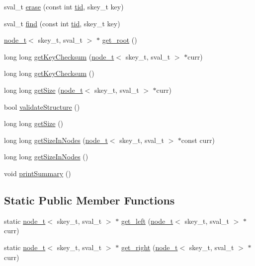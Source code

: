 \begin{DoxyCompactItemize}
\item 
sval\+\_\+t \hyperlink{classnatarajan__ext__bst__lf_a4e26b944d7a22b38c367a5a9272a65df}{erase} (const int \hyperlink{microbench_2main_8cpp_a9ca9869868fe7e7a38a921cc7de4103f}{tid}, skey\+\_\+t key)
\item 
sval\+\_\+t \hyperlink{classnatarajan__ext__bst__lf_aaca04e90b6cd390c3cf5701a08bcdb51}{find} (const int \hyperlink{microbench_2main_8cpp_a9ca9869868fe7e7a38a921cc7de4103f}{tid}, skey\+\_\+t key)
\item 
\hyperlink{structnode__t}{node\+\_\+t}$<$ skey\+\_\+t, sval\+\_\+t $>$ $\ast$ \hyperlink{classnatarajan__ext__bst__lf_aa6b371791b726b19343e1a6c64d38f92}{get\+\_\+root} ()
\item 
long long \hyperlink{classnatarajan__ext__bst__lf_a33ed925f7c23b46bf67a688d78e1714a}{get\+Key\+Checksum} (\hyperlink{structnode__t}{node\+\_\+t}$<$ skey\+\_\+t, sval\+\_\+t $>$ $\ast$curr)
\item 
long long \hyperlink{classnatarajan__ext__bst__lf_a6120769d8b8d6a14e673649d6ece6454}{get\+Key\+Checksum} ()
\item 
long long \hyperlink{classnatarajan__ext__bst__lf_a71a59c42d573aa3150a7a46d9ca94041}{get\+Size} (\hyperlink{structnode__t}{node\+\_\+t}$<$ skey\+\_\+t, sval\+\_\+t $>$ $\ast$curr)
\item 
bool \hyperlink{classnatarajan__ext__bst__lf_a95852943b22caf6203a7c86b31d501be}{validate\+Structure} ()
\item 
long long \hyperlink{classnatarajan__ext__bst__lf_ac8b9304e8bf0c244a0efb0467a385c23}{get\+Size} ()
\item 
long long \hyperlink{classnatarajan__ext__bst__lf_a39d920a7b800482d29679e70b79fb04e}{get\+Size\+In\+Nodes} (\hyperlink{structnode__t}{node\+\_\+t}$<$ skey\+\_\+t, sval\+\_\+t $>$ $\ast$const curr)
\item 
long long \hyperlink{classnatarajan__ext__bst__lf_aaf5630b2b2852d681914c9ac47b622fd}{get\+Size\+In\+Nodes} ()
\item 
void \hyperlink{classnatarajan__ext__bst__lf_a4d041c7fc819e57286e1907757a68895}{print\+Summary} ()
\end{DoxyCompactItemize}
\subsection*{Static Public Member Functions}
\begin{DoxyCompactItemize}
\item 
static \hyperlink{structnode__t}{node\+\_\+t}$<$ skey\+\_\+t, sval\+\_\+t $>$ $\ast$ \hyperlink{classnatarajan__ext__bst__lf_a51e5eea5239d5a12b5cbf99389affba4}{get\+\_\+left} (\hyperlink{structnode__t}{node\+\_\+t}$<$ skey\+\_\+t, sval\+\_\+t $>$ $\ast$curr)
\item 
static \hyperlink{structnode__t}{node\+\_\+t}$<$ skey\+\_\+t, sval\+\_\+t $>$ $\ast$ \hyperlink{classnatarajan__ext__bst__lf_acad3f9381d04db56dbc3fd77c61c28ae}{get\+\_\+right} (\hyperlink{structnode__t}{node\+\_\+t}$<$ skey\+\_\+t, sval\+\_\+t $>$ $\ast$curr)
\end{DoxyCompactItemize}
